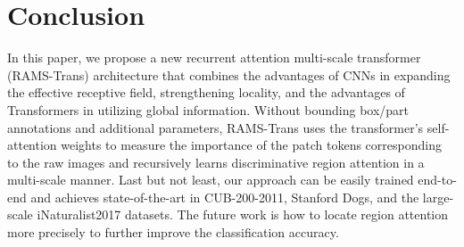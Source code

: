 \documentclass[sigconf]{acmart}
\begin{document}
\section{Conclusion}
In this paper, we propose a new recurrent attention multi-scale transformer (RAMS-Trans) architecture that combines the advantages of CNNs in expanding the effective receptive field, strengthening locality, and the advantages of Transformers in utilizing global information. Without bounding box/part annotations and additional parameters, RAMS-Trans uses the transformer's self-attention weights to measure the importance of the patch tokens corresponding to the raw images and recursively learns discriminative region attention in a multi-scale manner. Last but not least, our approach can be easily trained end-to-end and achieves state-of-the-art in CUB-200-2011, Stanford Dogs, and the large-scale iNaturalist2017 datasets. The future work is how to locate region attention more precisely to further improve the classification accuracy.




\end{document}
